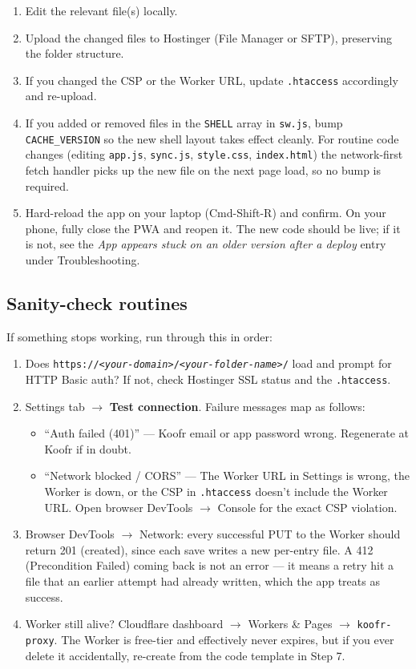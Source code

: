 \documentclass[11pt,a4paper]{article}
\begin{document}
\begin{enumerate}[leftmargin=*,nosep]
  \item Edit the relevant file(s) locally.
  \item Upload the changed files to Hostinger (File Manager or SFTP), preserving the folder structure.
  \item If you changed the CSP or the Worker URL, update \texttt{.htaccess} accordingly and re-upload.
  \item If you added or removed files in the \texttt{SHELL} array in \texttt{sw.js}, bump \texttt{CACHE\_VERSION} so the new shell layout takes effect cleanly. For routine code changes (editing \texttt{app.js}, \texttt{sync.js}, \texttt{style.css}, \texttt{index.html}) the network-first fetch handler picks up the new file on the next page load, so no bump is required.
  \item Hard-reload the app on your laptop (Cmd-Shift-R) and confirm. On your phone, fully close the PWA and reopen it. The new code should be live; if it is not, see the \emph{App appears stuck on an older version after a deploy} entry under Troubleshooting.
\end{enumerate}

\subsection{Sanity-check routines}

If something stops working, run through this in order:

\begin{enumerate}[leftmargin=*,nosep]
  \item Does \texttt{https://\textit{\color{red!70!black}<your-domain>}/\textit{\color{red!70!black}<your-folder-name>}/} load and prompt for HTTP Basic auth? If not, check Hostinger SSL status and the \texttt{.htaccess}.
  \item Settings tab $\rightarrow$ \textbf{Test connection}. Failure messages map as follows:
    \begin{itemize}[leftmargin=*,nosep]
      \item ``Auth failed (401)'' --- Koofr email or app password wrong. Regenerate at Koofr if in doubt.
      \item ``Network blocked / CORS'' --- The Worker URL in Settings is wrong, the Worker is down, or the CSP in \texttt{.htaccess} doesn't include the Worker URL. Open browser DevTools $\rightarrow$ Console for the exact CSP violation.
    \end{itemize}
  \item Browser DevTools $\rightarrow$ Network: every successful PUT to the Worker should return 201 (created), since each save writes a new per-entry file. A 412 (Precondition Failed) coming back is not an error --- it means a retry hit a file that an earlier attempt had already written, which the app treats as success.
  \item Worker still alive? Cloudflare dashboard $\rightarrow$ Workers \& Pages $\rightarrow$ \texttt{koofr-proxy}. The Worker is free-tier and effectively never expires, but if you ever delete it accidentally, re-create from the code template in Step 7.
\end{enumerate}
\end{document}
